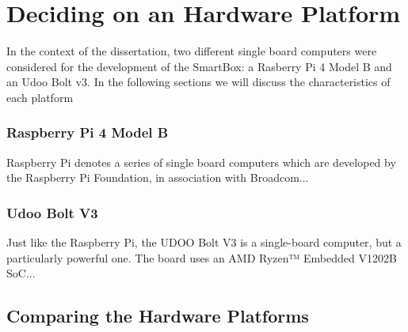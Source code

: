 


\section{Deciding on an Hardware Platform}

In the context of the dissertation, two different single board computers were considered for the development of the SmartBox: a Rasberry Pi 4 Model B and an Udoo Bolt v3. In the following sections we will discuss the characteristics of each platform 


\subsubsection{Raspberry Pi 4 Model B}

Raspberry Pi denotes a series of single board computers which are developed by the Raspberry Pi Foundation, in association with Broadcom...

\subsubsection{Udoo Bolt V3}

Just like the Raspberry Pi, the UDOO Bolt V3 is a single-board computer, but a particularly powerful one. The board uses an AMD Ryzen™ Embedded V1202B SoC...

\subsection{Comparing the Hardware Platforms}

